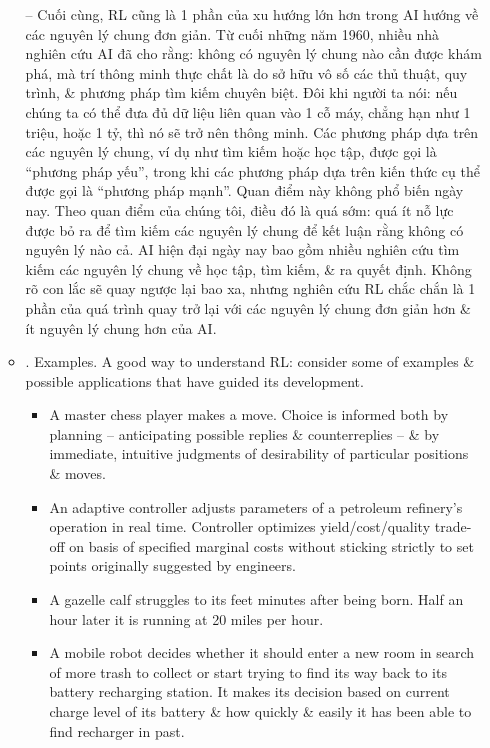 \documentclass{article}
\begin{document}
\begin{itemize}
\begin{itemize}
        -- Cuối cùng, RL cũng là 1 phần của xu hướng lớn hơn trong AI hướng về các nguyên lý chung đơn giản. Từ cuối những năm 1960, nhiều nhà nghiên cứu AI đã cho rằng: không có nguyên lý chung nào cần được khám phá, mà trí thông minh thực chất là do sở hữu vô số các thủ thuật, quy trình, \& phương pháp tìm kiếm chuyên biệt. Đôi khi người ta nói: nếu chúng ta có thể đưa đủ dữ liệu liên quan vào 1 cỗ máy, chẳng hạn như 1 triệu, hoặc 1 tỷ, thì nó sẽ trở nên thông minh. Các phương pháp dựa trên các nguyên lý chung, ví dụ như tìm kiếm hoặc học tập, được gọi là ``phương pháp yếu'', trong khi các phương pháp dựa trên kiến thức cụ thể được gọi là ``phương pháp mạnh''. Quan điểm này không phổ biến ngày nay. Theo quan điểm của chúng tôi, điều đó là quá sớm: quá ít nỗ lực được bỏ ra để tìm kiếm các nguyên lý chung để kết luận rằng không có nguyên lý nào cả. AI hiện đại ngày nay bao gồm nhiều nghiên cứu tìm kiếm các nguyên lý chung về học tập, tìm kiếm, \& ra quyết định. Không rõ con lắc sẽ quay ngược lại bao xa, nhưng nghiên cứu RL chắc chắn là 1 phần của quá trình quay trở lại với các nguyên lý chung đơn giản hơn \& ít nguyên lý chung hơn của AI.
        \item {. Examples.} A good way to understand RL: consider some of examples \& possible applications that have guided its development.
        \begin{itemize}
            \item A master chess player makes a move. Choice is informed both by planning -- anticipating possible replies \& counterreplies -- \& by immediate, intuitive judgments of desirability of particular positions \& moves.
            \item An adaptive controller adjusts parameters of a petroleum refinery's operation in real time. Controller optimizes yield/cost/quality trade-off on basis of specified marginal costs without sticking strictly to set points originally suggested by engineers.
            \item A gazelle calf struggles to its feet minutes after being born. Half an hour later it is running at 20 miles per hour.
            \item A mobile robot decides whether it should enter a new room in search of more trash to collect or start trying to find its way back to its battery recharging station. It makes its decision based on current charge level of its battery \& how quickly \& easily it has been able to find recharger in past.

\end{itemize}
\end{itemize}
\end{itemize}
\end{document}
